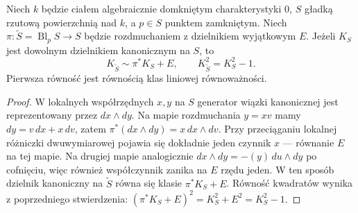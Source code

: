 \begin{stwierdzenie}
\label{st:ga6-Kblowup}
Niech $k$ będzie ciałem algebraicznie domkniętym
charakterystyki $0$, $S$ gładką rzutową powierzchnią
nad $k$, a $p\in S$ punktem zamkniętym. Niech
$\pi:\widetilde S=\operatorname{Bl}_pS\to S$ będzie
rozdmuchaniem z dzielnikiem wyjątkowym $E$.
Jeżeli $K_S$ jest dowolnym dzielnikiem kanonicznym
na $S$, to
\[
 K_{\widetilde S}\sim\pi^*K_S+E,
 \qquad K_{\widetilde S}^2=K_S^2-1.
\]
Pierwsza równość jest równością klas liniowej równoważności.
\end{stwierdzenie}
\begin{proof}
W lokalnych współrzędnych $x,y$ na $S$ generator
wiązki kanonicznej jest reprezentowany przez
$dx\wedge dy$. Na mapie rozdmuchania $y=xv$
mamy $dy=v\,dx+x\,dv$, zatem
$\pi^*(dx\wedge dy)=x\,dx\wedge dv$.
Przy przeciąganiu lokalnej różniczki dwuwymiarowej
pojawia się dokładnie jeden czynnik $x$ — równanie
$E$ na tej mapie. Na drugiej mapie analogicznie
$dx\wedge dy=-(y)\,du\wedge dy$ po cofnięciu,
więc również współczynnik zanika na $E$ rzędu jeden.
W ten sposób dzielnik kanoniczny na $\widetilde S$
równa się klasie $\pi^*K_S+E$.
Równość kwadratów wynika z poprzedniego stwierdzenia:
$(\pi^*K_S+E)^2=K_S^2+E^2=K_S^2-1$.
\end{proof}

